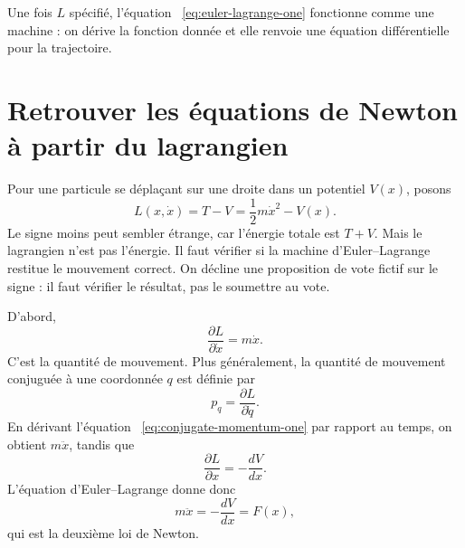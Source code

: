 Une fois \(L\) spécifié, l’équation ~\eqref{eq:euler-lagrange-one} fonctionne comme une machine : on dérive la fonction donnée et elle renvoie une équation différentielle pour la trajectoire.

\begin{classroomqa}
\end{classroomqa}

\section{Retrouver les équations de Newton à partir du lagrangien}

Pour une particule se déplaçant sur une droite dans un potentiel \(V(x)\), posons
\begin{equation}
  L(x,\dot x)=T-V
  =\frac12m\dot x^2-V(x).
  \label{eq:lagrangian-tv-one}
\end{equation}
Le signe moins peut sembler étrange, car l’énergie totale est \(T+V\). Mais le lagrangien n’est pas l’énergie. Il faut vérifier si la machine d’Euler--Lagrange restitue le mouvement correct. On décline une proposition de vote fictif sur le signe : il faut vérifier le résultat, pas le soumettre au vote.

D’abord,
\begin{equation}
  \frac{\partial L}{\partial\dot x}=m\dot x.
  \label{eq:conjugate-momentum-one}
\end{equation}
C’est la quantité de mouvement. Plus généralement, la quantité de mouvement conjuguée à une coordonnée \(q\) est définie par
\begin{equation}
  p_q=\frac{\partial L}{\partial\dot q}.
  \label{eq:conjugate-momentum-general}
\end{equation}
En dérivant l’équation ~\eqref{eq:conjugate-momentum-one} par rapport au temps, on obtient
\(m\ddot x\), tandis que
\begin{equation}
  \frac{\partial L}{\partial x}
  =-\frac{dV}{dx}.
  \label{eq:lagrangian-position-derivative}
\end{equation}
L’équation d’Euler--Lagrange donne donc
\begin{equation}
  m\ddot x=-\frac{dV}{dx}=F(x),
  \label{eq:newton-from-action}
\end{equation}
qui est la deuxième loi de Newton.

